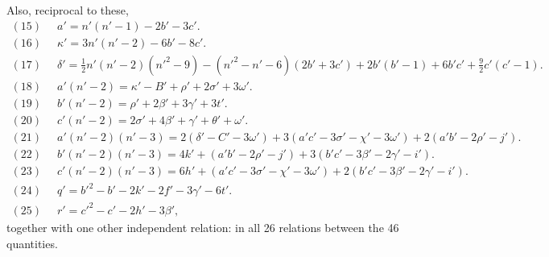 \documentclass[11pt,a4paper]{article}
\begin{document}
\noindent Also, reciprocal to these,
\begin{align*}
  (15)\;\; & a' = n'(n'-1) - 2b' - 3c'. \\
  (16)\;\; & \kappa' = 3n'(n'-2) - 6b' - 8c'. \\
  (17)\;\; & \delta' = \tfrac{1}{2} n'(n'-2)(n'^{2}-9)
            - (n'^{2}-n'-6)(2b'+3c') + 2b'(b'-1) + 6b'c' + \tfrac{9}{2} c'(c'-1). \\
  (18)\;\; & a'(n'-2) = \kappa' - B' + \rho' + 2\sigma' + 3\omega'. \\
  (19)\;\; & b'(n'-2) = \rho' + 2\beta' + 3\gamma' + 3t'. \\
  (20)\;\; & c'(n'-2) = 2\sigma' + 4\beta' + \gamma' + \theta' + \omega'. \\
  (21)\;\; & a'(n'-2)(n'-3) = 2(\delta' - C' - 3\omega')
                     + 3(a'c' - 3\sigma' - \chi' - 3\omega')
                     + 2(a'b' - 2\rho' - j'). \\
  (22)\;\; & b'(n'-2)(n'-3) = 4k' + (a'b' - 2\rho' - j')
                     + 3(b'c' - 3\beta' - 2\gamma' - i'). \\
  (23)\;\; & c'(n'-2)(n'-3) = 6h' + (a'c' - 3\sigma' - \chi' - 3\omega')
                     + 2(b'c' - 3\beta' - 2\gamma' - i'). \\
  (24)\;\; & q' = b'^{2} - b' - 2k' - 2f' - 3\gamma' - 6t'. \\
  (25)\;\; & r' = c'^{2} - c' - 2h' - 3\beta',
\end{align*}
together with one other independent relation: in all 26 relations between the
46 quantities.

\medskip
\end{document}
